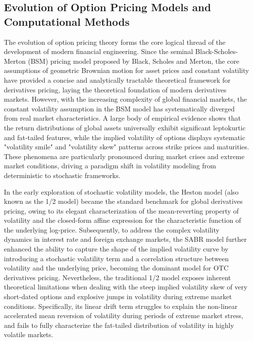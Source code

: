 \subsection{Evolution of Option Pricing Models and Computational Methods}
The evolution of option pricing theory forms the core logical thread of the development of modern financial engineering. Since the seminal Black-Scholes-Merton (BSM) pricing model proposed by Black, Scholes and Merton, the core assumptions of geometric Brownian motion for asset prices and constant volatility have provided a concise and analytically tractable theoretical framework for derivatives pricing, laying the theoretical foundation of modern derivatives markets. However, with the increasing complexity of global financial markets, the constant volatility assumption in the BSM model has systematically diverged from real market characteristics. A large body of empirical evidence shows that the return distributions of global assets universally exhibit significant leptokurtic and fat-tailed features, while the implied volatility of options displays systematic "volatility smile" and "volatility skew" patterns across strike prices and maturities. These phenomena are particularly pronounced during market crises and extreme market conditions, driving a paradigm shift in volatility modeling from deterministic to stochastic frameworks.

In the early exploration of stochastic volatility models, the Heston model (also known as the 1/2 model) became the standard benchmark for global derivatives pricing, owing to its elegant characterization of the mean-reverting property of volatility and the closed-form affine expression for the characteristic function of the underlying log-price. Subsequently, to address the complex volatility dynamics in interest rate and foreign exchange markets, the SABR model further enhanced the ability to capture the shape of the implied volatility curve by introducing a stochastic volatility term and a correlation structure between volatility and the underlying price, becoming the dominant model for OTC derivatives pricing. Nevertheless, the traditional 1/2 model exposes inherent theoretical limitations when dealing with the steep implied volatility skew of very short-dated options and explosive jumps in volatility during extreme market conditions. Specifically, its linear drift term struggles to explain the non-linear accelerated mean reversion of volatility during periods of extreme market stress, and fails to fully characterize the fat-tailed distribution of volatility in highly volatile markets.


